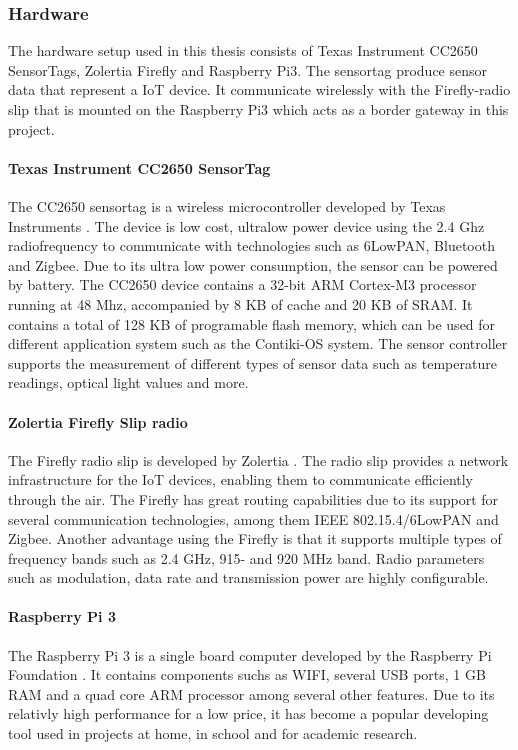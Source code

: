 \subsubsection{Hardware}
The hardware setup used in this thesis consists of Texas Instrument CC2650 SensorTags, Zolertia Firefly and Raspberry Pi3. The sensortag produce sensor data that represent a IoT device. It communicate wirelessly with the Firefly-radio slip that is mounted on the Raspberry Pi3 which acts as a border gateway in this project. 

\paragraph{Texas Instrument CC2650 SensorTag}
The CC2650 sensortag is a wireless microcontroller developed by Texas Instruments \cite{CC2650}. The device is low cost, ultralow power device using the 2.4 Ghz radiofrequency to communicate with technologies such as 6LowPAN, Bluetooth and Zigbee. Due to its ultra low power consumption, the sensor can be powered by battery.
The CC2650 device contains a 32-bit ARM Cortex-M3 processor running at 48 Mhz, accompanied by 8 KB of cache and 20 KB of SRAM. It contains a total of 128 KB of programable flash memory, which can be used for different application system such as the Contiki-OS system. The sensor controller supports the measurement of different types of sensor data such as temperature readings, optical light values and more. 


\paragraph{Zolertia Firefly Slip radio}
The Firefly radio slip is developed by Zolertia \cite{Firefly}. The radio slip provides a network infrastructure for the IoT devices, enabling them to communicate efficiently through the air. The Firefly has great routing capabilities due to its support for several communication technologies, among them IEEE 802.15.4/6LowPAN and Zigbee. Another advantage using the Firefly is that it supports multiple types of frequency bands such as 2.4 GHz, 915- and 920 MHz band. Radio parameters such as modulation, data rate and transmission power are highly configurable.

\paragraph{Raspberry Pi 3}
The Raspberry Pi 3 is a single board computer developed by the Raspberry Pi Foundation \cite{RP3}. It contains components suchs as WIFI, several USB ports, 1 GB RAM and a quad core ARM processor among several other features. Due to its relativly high performance for a low price, it has become a popular developing tool used in projects at home, in school and for academic research.
